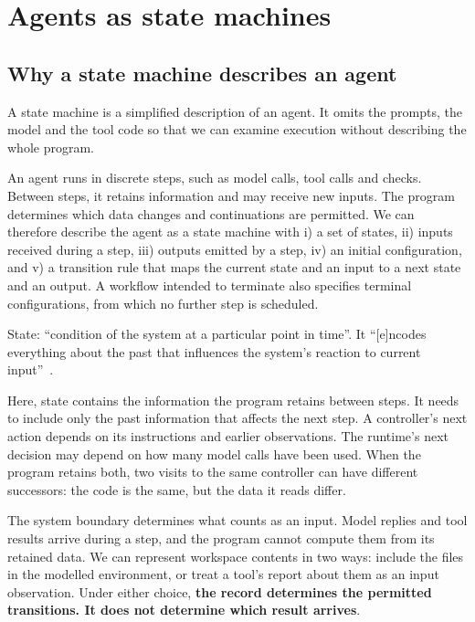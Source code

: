 \section{Agents as state machines}
\label{sec:efsm}

\subsection{Why a state machine describes an agent}
\label{sec:efsm-why}

A state machine is a simplified description of an agent. It omits the prompts, the model and the
tool code so that we can examine execution without describing the whole program.

An agent runs in discrete steps, such as model calls, tool calls and checks. Between steps, it
retains information and may receive new inputs. The program determines which data changes and
continuations are permitted. We can therefore describe the agent as a state machine with i) a set
of states, ii) inputs received during a step, iii) outputs emitted by a step, iv) an initial
configuration, and v) a transition rule that maps the current state and an input to a next state
and an output. A workflow intended to terminate also specifies terminal configurations, from
which no further step is scheduled.

\begin{definition}[State]
\label{def:state}
State: ``condition of the system at a particular point in time''. It ``[e]ncodes everything about
the past that influences the system's reaction to current input''~\citep[slide~10]{seshia2015discrete}.
\end{definition}

Here, state contains the information the program retains between steps. It needs to include only
the past information that affects the next step. A controller's next action depends on its
instructions and earlier observations. The runtime's next decision may depend on how many model
calls have been used. When the program retains both, two visits to the same controller can have
different successors: the code is the same, but the data it reads differ.

The system boundary determines what counts as an input. Model replies and tool results arrive
during a step, and the program cannot compute them from its retained data. We can represent
workspace contents in two ways: include the files in the modelled environment, or treat a tool's
report about them as an input observation. Under either choice, \textbf{the record determines the
permitted transitions. It does not determine which result arrives}.

